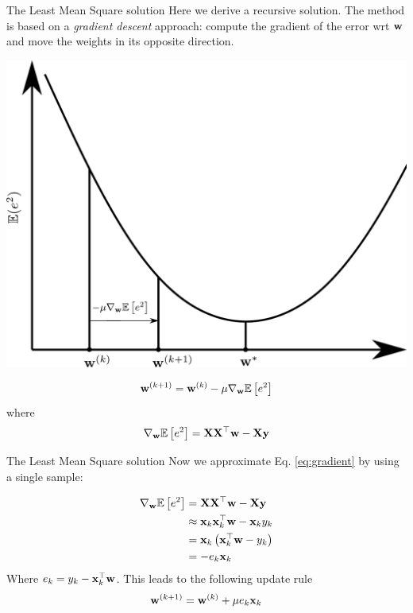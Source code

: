 \documentclass{beamer}
\begin{document}
\begin{frame}{The Least Mean Square solution}
Here we derive a recursive solution. The method is based on a \emph{gradient descent} approach:  compute the gradient of the error wrt ${\bf w}$ and move the weights in its opposite direction. 
\begin{multicols}{2}
\begin{center}
\includegraphics[scale=0.2]{Module 1 (NN)/pics/gradient_descent.pdf}
\end{center}
\begin{equation}\label{eq:gradient_descent}
    {\bf w}^{(k+1)} = {\bf w}^{(k)} - \mu \nabla_{\bf w} \mathbb{E}\left[ e^2 \right]
\end{equation}
where
\begin{equation}\label{eq:gradient}
    \nabla_{\bf w} \mathbb{E}\left[ e^2 \right] = {\bf X} {\bf X}^\top {\bf w} - {\bf X}{\bf y}
\end{equation}

\columnbreak

\end{multicols}
\end{frame}

\begin{frame}{The Least Mean Square solution}
Now we approximate Eq. \eqref{eq:gradient} by using a single sample:

\begin{equation}
\begin{split}
     \nabla_{\bf w} \mathbb{E}\left[ e^2 \right] &= {\bf X} {\bf X}^\top {\bf w} - {\bf X}{\bf y}\\ &\approx   {\bf x}_k {\bf x}_k^\top {\bf w} - {\bf x}_k y_k\\
      &={\bf x}_k \left({\bf x}_k^\top {\bf w} - y_k\right)\\
      &=-e_k{\bf x}_k
\end{split}
\end{equation}
Where $e_k=y_k-{\bf x}_k^\top {\bf w} $. This leads to the following update rule
    \begin{equation}\label{eq:LMS}
    {\bf w}^{(k+1)} = {\bf w}^{(k)} + \mu e_k{\bf x}_k
\end{equation}
\end{frame}
\end{document}
